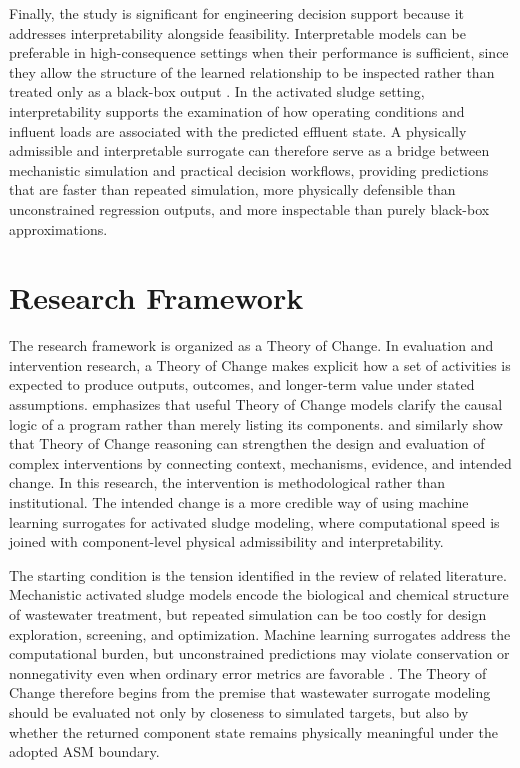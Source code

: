 \documentclass[12pt, twoside]{book}
\begin{document}
Finally, the study is significant for engineering decision support because it addresses interpretability
alongside feasibility. Interpretable models can be preferable in high-consequence settings when their
performance is sufficient, since they allow the structure of the learned relationship to be inspected rather
than treated only as a black-box output \citep{Rudin2019}. In the activated sludge setting, interpretability
supports the examination of how operating conditions and influent loads are associated with the predicted
effluent state. A physically admissible and interpretable surrogate can therefore serve as a bridge between
mechanistic simulation and practical decision workflows, providing predictions that are faster than repeated
simulation, more physically defensible than unconstrained regression outputs, and more inspectable than purely
black-box approximations.

\section{Research Framework}

The research framework is organized as a Theory of Change. In evaluation and intervention
research, a Theory of Change makes explicit how a set of activities is expected to produce outputs, outcomes,
and longer-term value under stated assumptions. \citet{Mayne2015} emphasizes that useful Theory of Change
models clarify the causal logic of a program rather than merely listing its components. \citet{DeSilva2014}
and \citet{Breuer2016} similarly show that Theory of Change reasoning can strengthen the design and evaluation
of complex interventions by connecting context, mechanisms, evidence, and intended change. In this
research, the intervention is methodological rather than institutional. The intended change is a more
credible way of using machine learning surrogates for activated sludge modeling, where computational speed is
joined with component-level physical admissibility and interpretability.

The starting condition is the tension identified in the review of related literature. Mechanistic activated
sludge models encode the biological and chemical structure of wastewater treatment, but repeated simulation can
be too costly for design exploration, screening, and optimization. Machine learning surrogates address the
computational burden, but unconstrained predictions may violate conservation or nonnegativity even when ordinary
error metrics are favorable \citep{Hansen2024,KircherVotsmeier2025,Shen2023}. The Theory of Change therefore
begins from the premise that wastewater surrogate modeling should be evaluated not only by closeness to
simulated targets, but also by whether the returned component state remains physically meaningful under the
adopted ASM boundary.
\end{document}
